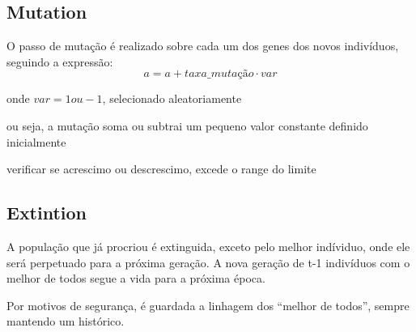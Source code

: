 \documentclass{article}
\begin{document}
\subsection{Mutation}
O passo de mutação é realizado sobre cada um dos genes dos novos indivíduos, seguindo a expressão:
\[a = a + taxa\_mutação \cdot var\]

onde \(var = 1 ou -1\), selecionado aleatoriamente

ou seja, a mutação soma ou subtrai um pequeno valor constante definido inicialmente

verificar se acrescimo ou descrescimo, excede o range do limite


\subsection{Extintion}
A população que já procriou é extinguida, exceto pelo melhor indíviduo, onde ele será perpetuado para a próxima geração. A nova geração de t-1 indivíduos com o melhor de todos segue a vida para a próxima época.

Por motivos de segurança, é guardada a linhagem dos “melhor de todos”, sempre mantendo um histórico.


\printbibliography
\end{document}

